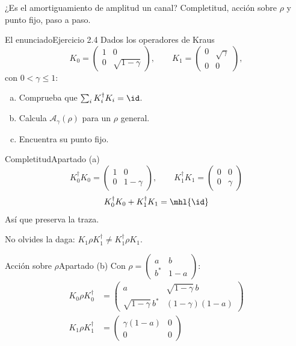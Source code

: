 \documentclass[12pt]{beamer}
\begin{document}
  {¿Es el amortiguamiento de amplitud un canal?}
  {Completitud, acción sobre $\rho$ y punto fijo, paso a paso.}

\begin{frame}{El enunciado}{Ejercicio 2.4}
Dados los operadores de Kraus
\[
  K_0 = \begin{pmatrix} 1 & 0 \\ 0 & \sqrt{1-\gamma} \end{pmatrix},
  \qquad
  K_1 = \begin{pmatrix} 0 & \sqrt{\gamma} \\ 0 & 0 \end{pmatrix},
\]
con $0 < \gamma \le 1$:
\begin{enumerate}[(a)]
  \item Comprueba que $\sum_i K_i^\dagger K_i = \id$.
  \item Calcula $\mathcal{A}_\gamma(\rho)$ para un $\rho$ general.
  \item Encuentra su punto fijo.
\end{enumerate}
\end{frame}

\begin{frame}{Completitud}{Apartado (a)}
\[
  K_0^\dagger K_0 = \begin{pmatrix} 1 & 0 \\ 0 & 1-\gamma \end{pmatrix},
  \qquad
  K_1^\dagger K_1 = \begin{pmatrix} 0 & 0 \\ 0 & \gamma \end{pmatrix}
\]
\[
  K_0^\dagger K_0 + K_1^\dagger K_1 = \mhl{\id}
\]
Así que preserva la traza. 
\begin{notebox}[Ojo]
No olvides la daga:
$K_1\rho K_1^\dagger \neq K_1^\dagger\rho K_1$.
\end{notebox}
\end{frame}

\begin{frame}{Acción sobre $\rho$}{Apartado (b)}
Con $\rho = \begin{pmatrix} a & b \\ b^* & 1-a \end{pmatrix}$:
\begin{align*}
  K_0\rho K_0^\dagger &= \begin{pmatrix} a & \sqrt{1-\gamma}\,b \\ \sqrt{1-\gamma}\,b^* & (1-\gamma)(1-a) \end{pmatrix}\\
  K_1\rho K_1^\dagger &= \begin{pmatrix} \gamma(1-a) & 0 \\ 0 & 0 \end{pmatrix}
\end{align*}
\end{frame}
\end{document}

